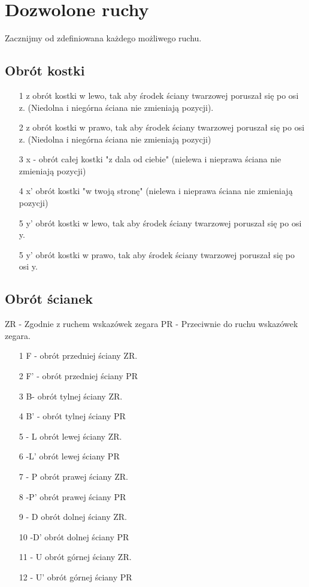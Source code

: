 \documentclass{article}
\begin{document}
\section{Dozwolone ruchy}
Zacznijmy od zdefiniowana każdego możliwego ruchu.

\subsection{Obrót kostki}
\begin{enumerate}
\item[1] z obrót kostki w lewo, tak aby środek ściany twarzowej poruszał się po osi z. (Niedolna i niegórna ściana nie zmieniają pozycji).

\item[2] z obrót kostki w prawo, tak aby środek ściany twarzowej poruszał się po osi z. (Niedolna i niegórna ściana nie zmieniają pozycji)
\item[3] x - obrót całej kostki "z dala od ciebie" (nielewa i nieprawa ściana nie zmieniają pozycji)
\item[4] x' obrót kostki "w twoją stronę" (nielewa i nieprawa ściana nie zmieniają pozycji)
\item[5] y' obrót kostki w lewo, tak aby środek ściany twarzowej poruszał się po osi y.
\item[5] y' obrót kostki w prawo, tak aby środek ściany twarzowej poruszał się po osi y.

\end{enumerate}

\subsection{Obrót ścianek}
ZR - Zgodnie z ruchem wskazówek zegara
PR - Przeciwnie do ruchu wskazówek zegara.

\begin{enumerate}
\item[1] F -  obrót przedniej ściany ZR.
\item[2] F' - obrót przedniej ściany PR 
\item[3] B-  obrót tylnej ściany ZR.
\item[4] B' - obrót tylnej ściany PR  
\item[5] - L  obrót lewej ściany ZR.
\item[6] -L' obrót lewej ściany PR 
\item[7] - P  obrót prawej ściany ZR.
\item[8] -P' obrót prawej ściany PR 
\item[9] - D  obrót dolnej ściany ZR.
\item[10] -D' obrót dolnej ściany PR 
\item[11] - U  obrót górnej ściany ZR.
\item[12] - U' obrót górnej ściany PR 

\end{enumerate}
\end{document}
